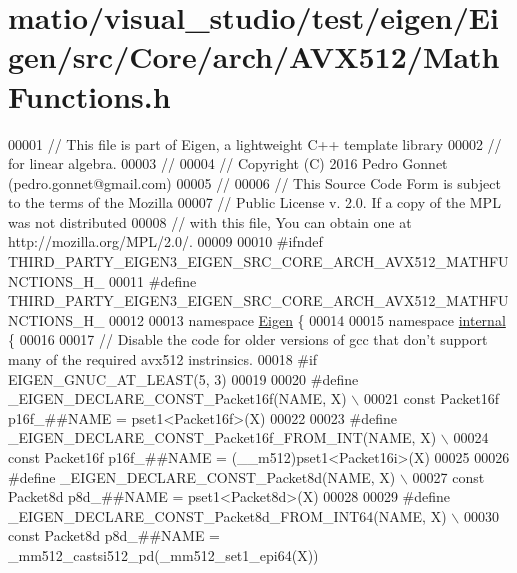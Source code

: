 \hypertarget{matio_2visual__studio_2test_2eigen_2_eigen_2src_2_core_2arch_2_a_v_x512_2_math_functions_8h_source}{}\section{matio/visual\+\_\+studio/test/eigen/\+Eigen/src/\+Core/arch/\+A\+V\+X512/\+Math\+Functions.h}
\label{matio_2visual__studio_2test_2eigen_2_eigen_2src_2_core_2arch_2_a_v_x512_2_math_functions_8h_source}

\begin{DoxyCode}
00001 \textcolor{comment}{// This file is part of Eigen, a lightweight C++ template library}
00002 \textcolor{comment}{// for linear algebra.}
00003 \textcolor{comment}{//}
00004 \textcolor{comment}{// Copyright (C) 2016 Pedro Gonnet (pedro.gonnet@gmail.com)}
00005 \textcolor{comment}{//}
00006 \textcolor{comment}{// This Source Code Form is subject to the terms of the Mozilla}
00007 \textcolor{comment}{// Public License v. 2.0. If a copy of the MPL was not distributed}
00008 \textcolor{comment}{// with this file, You can obtain one at http://mozilla.org/MPL/2.0/.}
00009 
00010 \textcolor{preprocessor}{#ifndef THIRD\_PARTY\_EIGEN3\_EIGEN\_SRC\_CORE\_ARCH\_AVX512\_MATHFUNCTIONS\_H\_}
00011 \textcolor{preprocessor}{#define THIRD\_PARTY\_EIGEN3\_EIGEN\_SRC\_CORE\_ARCH\_AVX512\_MATHFUNCTIONS\_H\_}
00012 
00013 \textcolor{keyword}{namespace }\hyperlink{namespace_eigen}{Eigen} \{
00014 
00015 \textcolor{keyword}{namespace }\hyperlink{namespaceinternal}{internal} \{
00016 
00017 \textcolor{comment}{// Disable the code for older versions of gcc that don't support many of the required avx512 instrinsics.}
00018 \textcolor{preprocessor}{#if EIGEN\_GNUC\_AT\_LEAST(5, 3)}
00019 
00020 \textcolor{preprocessor}{#define \_EIGEN\_DECLARE\_CONST\_Packet16f(NAME, X) \(\backslash\)}
00021 \textcolor{preprocessor}{  const Packet16f p16f\_##NAME = pset1<Packet16f>(X)}
00022 
00023 \textcolor{preprocessor}{#define \_EIGEN\_DECLARE\_CONST\_Packet16f\_FROM\_INT(NAME, X) \(\backslash\)}
00024 \textcolor{preprocessor}{  const Packet16f p16f\_##NAME = (\_\_m512)pset1<Packet16i>(X)}
00025 
00026 \textcolor{preprocessor}{#define \_EIGEN\_DECLARE\_CONST\_Packet8d(NAME, X) \(\backslash\)}
00027 \textcolor{preprocessor}{  const Packet8d p8d\_##NAME = pset1<Packet8d>(X)}
00028 
00029 \textcolor{preprocessor}{#define \_EIGEN\_DECLARE\_CONST\_Packet8d\_FROM\_INT64(NAME, X) \(\backslash\)}
00030 \textcolor{preprocessor}{  const Packet8d p8d\_##NAME = \_mm512\_castsi512\_pd(\_mm512\_set1\_epi64(X))}

\end{DoxyCode}
